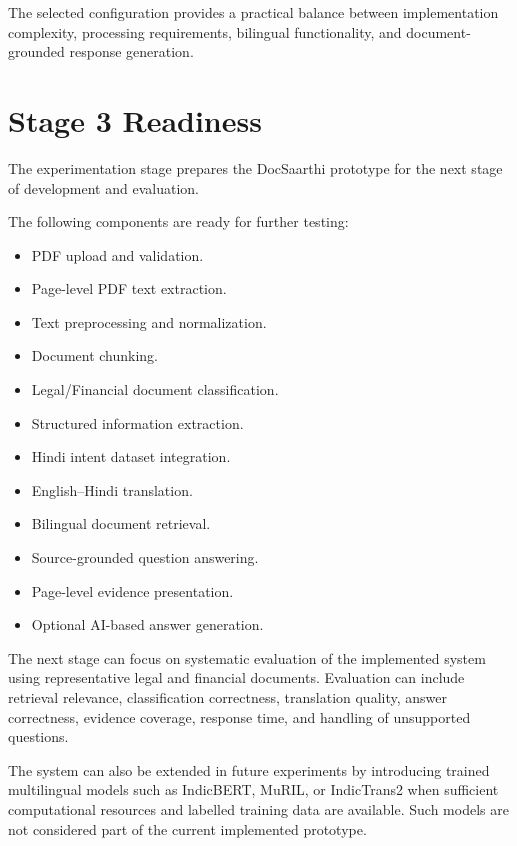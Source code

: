 The selected configuration provides a practical balance between
implementation complexity, processing requirements, bilingual
functionality, and document-grounded response generation.

\section{Stage 3 Readiness}

The experimentation stage prepares the DocSaarthi prototype for the
next stage of development and evaluation.

The following components are ready for further testing:

\begin{itemize}
    \item PDF upload and validation.
    \item Page-level PDF text extraction.
    \item Text preprocessing and normalization.
    \item Document chunking.
    \item Legal/Financial document classification.
    \item Structured information extraction.
    \item Hindi intent dataset integration.
    \item English--Hindi translation.
    \item Bilingual document retrieval.
    \item Source-grounded question answering.
    \item Page-level evidence presentation.
    \item Optional AI-based answer generation.
\end{itemize}

The next stage can focus on systematic evaluation of the implemented
system using representative legal and financial documents. Evaluation
can include retrieval relevance, classification correctness,
translation quality, answer correctness, evidence coverage, response
time, and handling of unsupported questions.

The system can also be extended in future experiments by introducing
trained multilingual models such as IndicBERT, MuRIL, or IndicTrans2
when sufficient computational resources and labelled training data
are available. Such models are not considered part of the current
implemented prototype.

